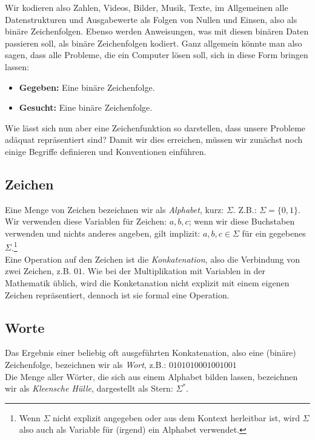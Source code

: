 {Wir kodieren also Zahlen, Videos, Bilder, Musik, Texte, im Allgemeinen alle Datenstrukturen
und Ausgabewerte als Folgen von Nullen und Einsen,
also als binäre Zeichenfolgen.
Ebenso werden Anweisungen, was mit diesen binären Daten passieren soll,
als binäre Zeichenfolgen kodiert.
Ganz allgemein könnte man also sagen, dass alle Probleme, die ein Computer lösen soll,
sich in diese Form bringen lassen:
\begin{itemize}
    \item \textbf{Gegeben:} Eine binäre Zeichenfolge.
    \item \textbf{Gesucht:} Eine binäre Zeichenfolge.
\end{itemize}

Wie lässt sich nun aber eine Zeichenfunktion so darstellen,
dass unsere Probleme adäquat repräsentiert sind?
Damit wir dies erreichen,
müssen wir zunächst noch einige Begriffe definieren und Konventionen einführen.

\subsection{Zeichen}

Eine Menge von Zeichen bezeichnen wir als \emph{Alphabet}, kurz: $\Sigma$.
Z.B.: $\Sigma = \{0,1\}$.\\

\noindent
Wir verwenden diese Variablen für Zeichen: $a,b,c$;
wenn wir diese Buchstaben verwenden und nichts anderes angeben,
gilt implizit: $a, b, c \in \Sigma$ für ein gegebenes $\Sigma$.\footnote{
Wenn $\Sigma$ nicht explizit angegeben oder aus dem Kontext herleitbar ist,
wird $\Sigma$ also auch als Variable für (irgend) ein Alphabet verwendet.}\\

\noindent
Eine Operation auf den Zeichen ist die \emph{Konkatenation},
also die Verbindung von zwei Zeichen, z.B. $01$.
Wie bei der Multiplikation mit Variablen in der Mathematik üblich,
wird die Konketanation nicht explizit mit einem eigenen Zeichen repräsentiert,
dennoch ist sie formal eine Operation.

\subsection{Worte}
Das Ergebnis einer beliebig oft ausgeführten Konkatenation,
also eine (binäre) Zeichenfolge,
bezeichnen wir als \emph{Wort}, z.B.: $0101010001001001$\\

\noindent
Die Menge aller Wörter,
die sich aus einem Alphabet bilden lassen,
bezeichnen wir als \emph{Kleensche Hülle}, dargestellt als Stern: $\Sigma^*$.\\

}

